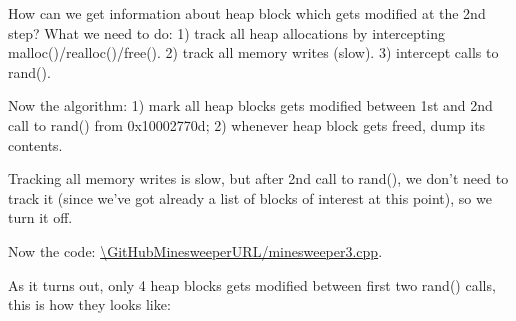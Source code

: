 How can we get information about heap block which gets modified at the 2nd step?
What we need to do:
1) track all heap allocations by intercepting malloc()/realloc()/free().
2) track all memory writes (slow).
3) intercept calls to rand().

Now the algorithm:
1) mark all heap blocks gets modified between 1st and 2nd call to rand() from 0x10002770d;
2) whenever heap block gets freed, dump its contents.

Tracking all memory writes is slow, but after 2nd call to rand(), we don't need to track it (since we've got already a list of blocks of interest at this point), so we turn it off.

Now the code: \url{\GitHubMinesweeperURL/minesweeper3.cpp}.

As it turns out, only 4 heap blocks gets modified between first two rand() calls, this is how they looks like:

